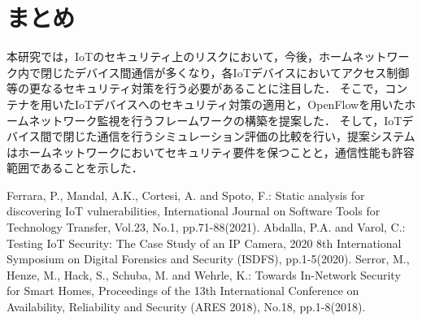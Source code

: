 \documentclass[a4paper,10pt,twocolumn,uplatex]{jsarticle}
\begin{document}
\section{まとめ}
本研究では，IoTのセキュリティ上のリスクにおいて，今後，ホームネットワーク内で閉じたデバイス間通信が多くなり，各IoTデバイスにおいてアクセス制御等の更なるセキュリティ対策を行う必要があることに注目した．
そこで，コンテナを用いたIoTデバイスへのセキュリティ対策の適用と，OpenFlowを用いたホームネットワーク監視を行うフレームワークの構築を提案した．
そして，IoTデバイス間で閉じた通信を行うシミュレーション評価の比較を行い，提案システムはホームネットワークにおいてセキュリティ要件を保つことと，通信性能も許容範囲であることを示した．

\footnotesize{
  \begin{thebibliography}{99}
     Ferrara, P., Mandal, A.K., Cortesi, A. and Spoto, F.: Static analysis for discovering IoT vulnerabilities, International Journal on Software Tools for Technology Transfer, Vol.23, No.1, pp.71-88(2021).
     Abdalla, P.A. and Varol, C.: Testing IoT Security: The Case Study of an IP Camera, 2020 8th International Symposium on Digital Forensics and Security (ISDFS), pp.1-5(2020).
     Serror, M., Henze, M., Hack, S., Schuba, M. and Wehrle, K.: Towards In-Network Security for Smart Homes, Proceedings of the 13th International Conference on Availability, Reliability and Security (ARES 2018), No.18, pp.1-8(2018).
  \end{thebibliography}
}

% 
% 

\end{document}
